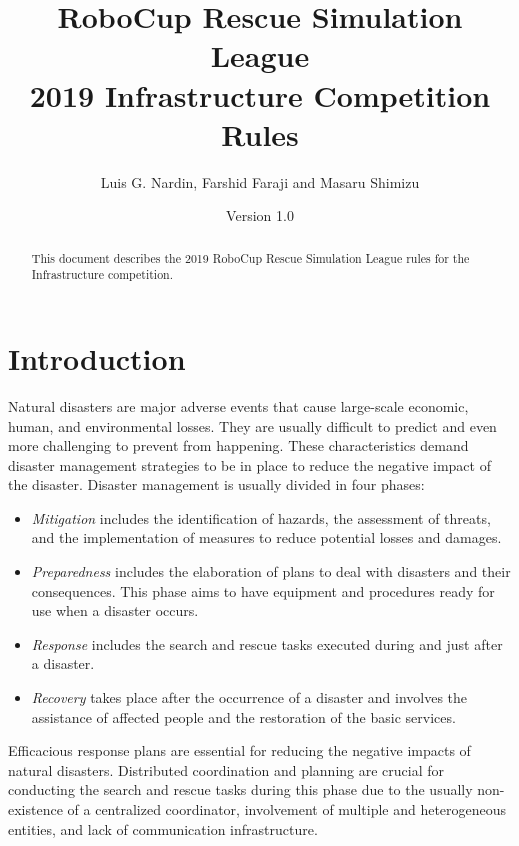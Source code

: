 \documentclass{article}
\begin{document}

\title{RoboCup Rescue Simulation League\\
       2019 Infrastructure Competition Rules}
\author{Luis G. Nardin, Farshid Faraji and Masaru Shimizu}
\date{Version 1.0}
\maketitle
\begin{abstract}
This document describes the 2019 RoboCup Rescue Simulation League rules for the Infrastructure competition.
\end{abstract}
\section{Introduction}
\label{sec:introduction}
Natural disasters are major adverse events that cause large-scale economic, human, and environmental losses. They are usually difficult to predict and even more challenging to prevent from happening. These characteristics demand disaster management strategies to be in place to reduce the negative impact of the disaster. Disaster management is usually divided in four phases:
\begin{itemize}
\item \emph{Mitigation} includes the identification of hazards, the assessment of threats, and the implementation of measures to reduce potential losses and damages.
\item \emph{Preparedness} includes the elaboration of plans to deal with disasters and their consequences. This phase aims to have equipment and procedures ready for use when a disaster occurs.
\item \emph{Response} includes the search and rescue tasks executed during and just after a disaster.
\item \emph{Recovery} takes place after the occurrence of a disaster and involves the assistance of affected people and the restoration of the basic services.
\end{itemize}

Efficacious response plans are essential for reducing the negative impacts of natural disasters. Distributed coordination and planning are crucial for conducting the search and rescue tasks during this phase due to the usually non-existence of a centralized coordinator, involvement of multiple and heterogeneous entities, and lack of communication infrastructure.
\end{document}
